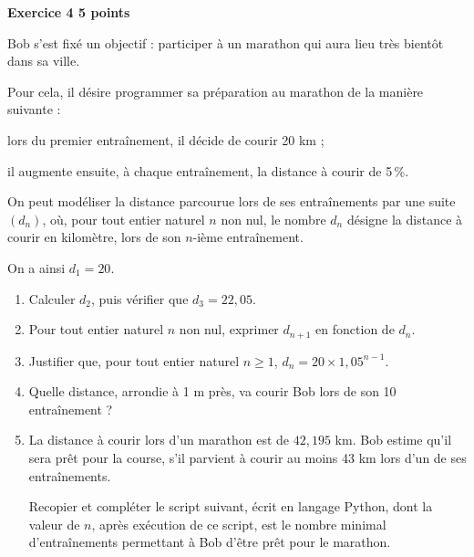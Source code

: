 \textbf{\large Exercice 4 \hfill 5 points}

\bigskip

Bob s'est fixé un objectif : participer à un marathon qui aura lieu très bientôt dans sa ville.

Pour cela, il désire programmer sa préparation au marathon de la manière suivante :

\begin{list}{\textbullet}{}
\item lors du premier entraînement, il décide de courir 20 km ;
\item il augmente ensuite, à chaque entraînement, la distance à courir de 5\,\%.
\end{list}

On peut modéliser la distance parcourue lors de ses entraînements par une suite $(d_n)$, où, pour tout entier naturel $n$ non nul, le nombre $d_n$ désigne la distance à courir en kilomètre, lors de son $n$-ième entraînement.

On a ainsi $d_1 = 20$.

\begin{enumerate}
\item Calculer $d_2$, puis vérifier que $d_3=22,05$.
\item Pour tout entier naturel $n$ non nul, exprimer $d_{n+1}$ en fonction de $d_n$.
\item Justifier que, pour tout entier naturel $n \geqslant 1$, $d_n= 20\times 1,05^{n-1}$.
\item Quelle distance, arrondie à 1 m près, va courir Bob lors de son 10\ieme{} entraînement ?
\item La distance à courir lors d'un marathon est de $42,195$ km. Bob estime qu'il sera prêt pour la
course, s'il parvient à courir au moins 43 km lors d'un de ses entraînements.

Recopier et compléter le script suivant, écrit en langage Python, dont la valeur de $n$, après exécution de ce script, est le nombre minimal d'entraînements permettant à Bob d'être prêt pour le marathon.


\begin{center}
\end{center}

\end{enumerate}



